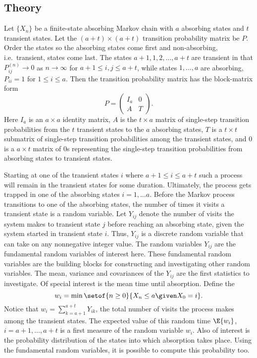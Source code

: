 \documentclass[12pt]{article}
\begin{document}
\subsection*{Theory}

Let \( \{ X_n \} \) be a finite-state absorbing Markov chain with \( a \)
absorbing states and \( t \) transient states.  Let the \( (a + t)
\times (a + t) \) transition probability matrix be \( P \).  Order the
states so the absorbing states come first and non-absorbing, i.e.\
transient, states come last.  The states
 \( a+1, 1, 2, \dots, a+t \) are transient in that
\( P^{(n)}_{ij} \to 0 \) as \( n \to \infty \) for
\( a+1 \le i,j \le a+t \), while states \( 1, \dots, a \) are absorbing,
\( P_{ii} = 1 \) for \( 1 \le i \le a \).
Then the transition probability matrix has the block-matrix form
\[
    P =
    \begin{pmatrix}
        I_a & 0 \\
        A & T
    \end{pmatrix}.
\]
Here \( I_{a} \) is an \( a \times a \) identity matrix, \( A \) is the \(
t \times a \) matrix of single-step transition probabilities from the \(
t \) transient states to the \( a \) absorbing states, \( T \) is a \( t
\times t \) submatrix of single-step transition probabilities among the
transient states, and \( 0 \) is a \( a \times t \) matrix of \( 0 \)s
representing the single-step transition probabilities from absorbing
states to transient states.

Starting at one of the transient states \( i \) where
\( a+1 \le i \le a+t \) such a process will remain in the transient states
for some duration.  Ultimately, the process gets trapped in one of the
absorbing states \( i = 1, \dots a \).  Before the Markov process
transitions to one of the absorbing states, the number of times it
visits a transient state is a random variable.  Let \( Y_{ij} \)
denote the number of visits the system makes to transient state
\( j \) before reaching an absorbing state, given the system started
in transient state \( i \). Thus, \( Y_{ij} \) is a discrete random
variable that can take on any nonnegative integer value.  The random
variables \( Y_{ij} \) are the fundamental random variables of
interest here.  These fundamental random variables are the building blocks
for constructing and investigating other random variables.  The mean,
variance and covariances of the \( Y_{ij} \) are the first
statistics to investigate.  Of special interest is the mean time until
absorption.%
Define the %
\[
    w_i = \min \setof{n \ge 0}{X_n \le a \given X_0 = i}.
\] Notice that \( w_i = \sum\limits_{k=a+1}^{a+t} Y_{ik} \),
the total number of visits the process makes among the transient states.
The expected value of this random time \( \E{w_i} \), \( i = a+1, \dots,
a+t \) is a first measure of the random variable \( w_i \). Also of
interest is the probability distribution of the states into which
absorption takes place.  Using the fundamental random variables, it is
possible to compute this probability too.
\end{document}
